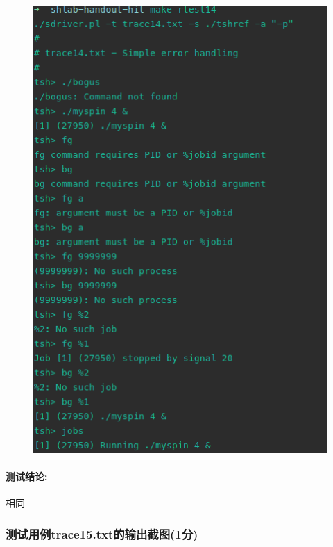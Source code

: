 \begin{figure}[H]
\begin{minipage}[c]{0.5\linewidth}
        \includegraphics[width=0.7\linewidth]{figures/rtest14.png}
    \end{minipage}
\end{figure}

\paragraph{测试结论:}相同

\subsubsection{测试用例trace15.txt的输出截图(1分)}\label{testend}

